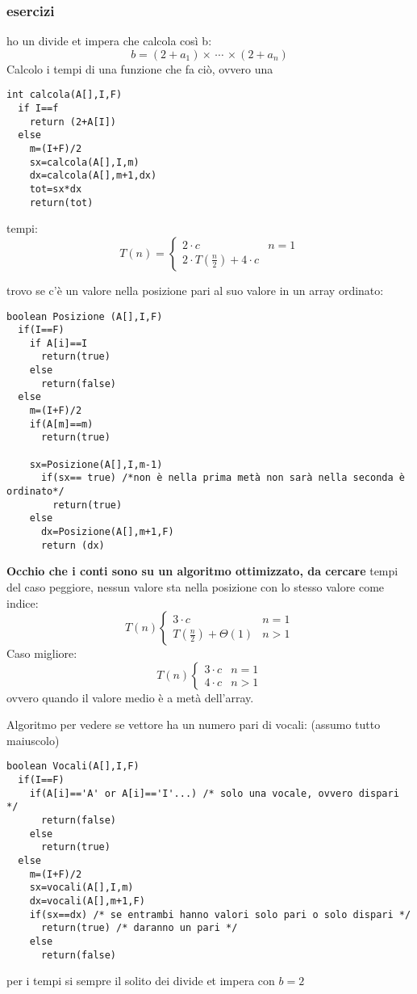 \documentclass[a4paper,12pt,oneside,tikz]{book}
\begin{document}
\subsubsection{esercizi}
\begin{esercizio}
	ho un divide et impera che calcola così b:
	$$b=(2+a_1)\times\,\cdots\,\times(2+a_n)$$
	Calcolo i tempi di una funzione che fa ciò, ovvero una \begin{verbatim}
int calcola(A[],I,F)
  if I==f
    return (2+A[I])
  else 
    m=(I+F)/2
    sx=calcola(A[],I,m)
    dx=calcola(A[],m+1,dx)
    tot=sx*dx
    return(tot)
\end{verbatim}
	tempi:
	$$T(n)=\begin{cases}
			2\cdot c & n=1 \\
			2\cdot T\left(\frac{n}{2}\right)+4\cdot c
		\end{cases}$$
\end{esercizio}
\begin{esercizio}
	trovo se c'è un valore nella posizione pari al suo valore in un array ordinato:
	\begin{verbatim}
boolean Posizione (A[],I,F)
  if(I==F)
    if A[i]==I
      return(true)
    else 
      return(false)
  else
    m=(I+F)/2
    if(A[m]==m)
      return(true)

    sx=Posizione(A[],I,m-1)
      if(sx== true) /*non è nella prima metà non sarà nella seconda è ordinato*/
        return(true)
    else
      dx=Posizione(A[],m+1,F)
      return (dx)
\end{verbatim}
	\textbf{Occhio che i conti sono su un algoritmo ottimizzato, da cercare}
	tempi del caso peggiore, nessun valore sta nella posizione con lo stesso valore come indice:
	$$T(n)\begin{cases}
			3\cdot c                            & n=1 \\
			T\left(\frac{n}{2}\right)+\Theta(1) & n>1
		\end{cases}$$
	Caso migliore:
	$$T(n)\begin{cases}
			3\cdot c & n=1 \\
			4\cdot c & n>1
		\end{cases}$$
	ovvero quando il valore medio è a metà dell'array.
\end{esercizio}
\begin{esercizio}
	Algoritmo per vedere se vettore ha un numero pari di vocali:
	(assumo tutto maiuscolo)
	\begin{verbatim}
boolean Vocali(A[],I,F)
  if(I==F)
    if(A[i]=='A' or A[i]=='I'...) /* solo una vocale, ovvero dispari */
      return(false)
    else
      return(true)
  else 
    m=(I+F)/2
    sx=vocali(A[],I,m)
    dx=vocali(A[],m+1,F)
    if(sx==dx) /* se entrambi hanno valori solo pari o solo dispari */
      return(true) /* daranno un pari */
    else
      return(false)
\end{verbatim}
	per i tempi si sempre il solito dei divide et impera con $b=2$
\end{esercizio}
\newpage
\end{document}
